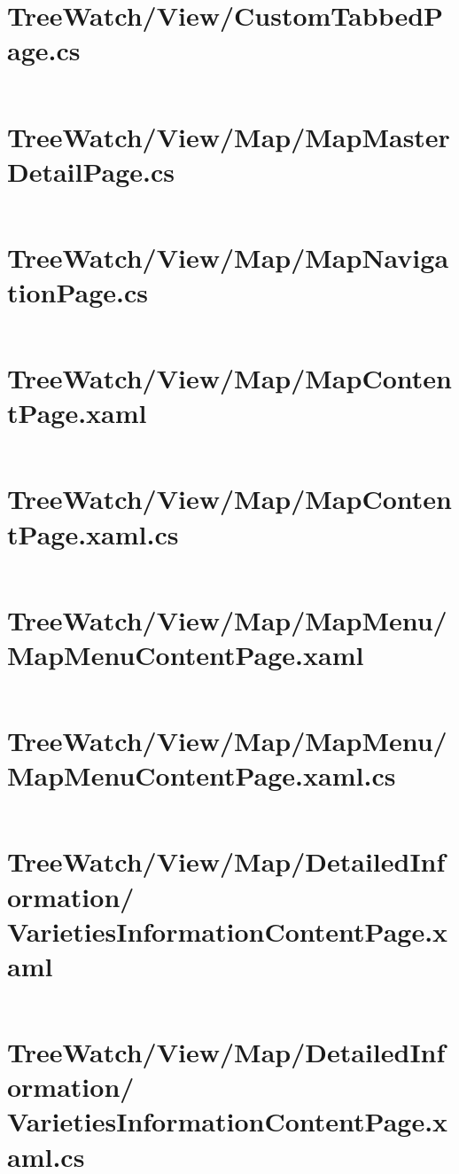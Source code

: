 \documentclass[12pt]{article}
\begin{document}
\tableofcontents


\section{TreeWatch/View/CustomTabbedPage.cs}
\inputminted[linenos,firstline=22]{csharp}{../../../src/TreeWatch/View/CustomTabbedPage.cs}
\section{TreeWatch/View/Map/MapMasterDetailPage.cs}
\inputminted[linenos,firstline=22]{csharp}{../../../src/TreeWatch/View/Map/MapMasterDetailPage.cs}
\section{TreeWatch/View/Map/MapNavigationPage.cs}
\inputminted[linenos,firstline=22]{csharp}{../../../src/TreeWatch/View/Map/MapNavigationPage.cs}
\section{TreeWatch/View/Map/MapContentPage.xaml}
\inputminted[linenos]{xml}{../../../src/TreeWatch/View/Map/MapContentPage.xaml}
\section{TreeWatch/View/Map/MapContentPage.xaml.cs}
\inputminted[linenos,firstline=22]{csharp}{../../../src/TreeWatch/View/Map/MapContentPage.xaml.cs}
\section{TreeWatch/View/Map/MapMenu/ MapMenuContentPage.xaml}
\inputminted[linenos]{xml}{../../../src/TreeWatch/View/Map/MapMenu/MapMenuContentPage.xaml}
\section{TreeWatch/View/Map/MapMenu/ MapMenuContentPage.xaml.cs}
\inputminted[linenos,firstline=22]{csharp}{../../../src/TreeWatch/View/Map/MapMenu/MapMenuContentPage.xaml.cs}
\section{TreeWatch/View/Map/DetailedInformation/ VarietiesInformationContentPage.xaml}
\inputminted[linenos]{xml}{../../../src/TreeWatch/View/Map/DetailedInformation/VarietiesInformationContentPage.xaml}
\section{TreeWatch/View/Map/DetailedInformation/ VarietiesInformationContentPage.xaml.cs}
\inputminted[linenos,firstline=22]{csharp}{../../../src/TreeWatch/View/Map/DetailedInformation/VarietiesInformationContentPage.xaml.cs}
\end{document}
